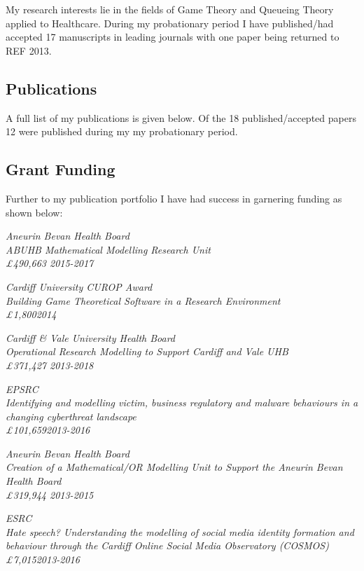 \documentclass{article}
\begin{document}
My research interests lie in the fields of Game Theory and Queueing Theory applied to Healthcare.
During my probationary period I have published/had accepted 17 manuscripts in leading journals with one paper being returned to REF 2013.

\subsection{Publications}

A full list of my publications is given below. Of the 18 published/accepted papers 12 were published during my my probationary period.



\subsection{Grant Funding}

Further to my publication portfolio I have had success in garnering funding as shown below:

\sl{Aneurin Bevan Health Board}\\
ABUHB Mathematical Modelling Research Unit\\
\pounds490,663 \hfill{2015-2017}


\sl{Cardiff University CUROP Award}\\
Building Game Theoretical Software in a Research Environment\\
\pounds1,800\hfill{2014}


\sl{Cardiff \& Vale University Health Board}\\
Operational Research Modelling to Support Cardiff and Vale UHB\\
\pounds 371,427 \hfill{2013-2018}


\sl{EPSRC}\\
Identifying and modelling victim, business regulatory and malware behaviours in a changing cyberthreat landscape\\
\pounds101,659\hfill{2013-2016}


\sl{Aneurin Bevan Health Board}\\
Creation of a Mathematical/OR Modelling Unit to Support the Aneurin Bevan Health Board\\
\pounds319,944 \hfill{2013-2015}


\sl{ESRC}\\
Hate speech? Understanding the modelling of social media identity formation and behaviour through the Cardiff Online Social Media Observatory (COSMOS)\\
\pounds7,015\hfill{2013-2016}
\end{document}
